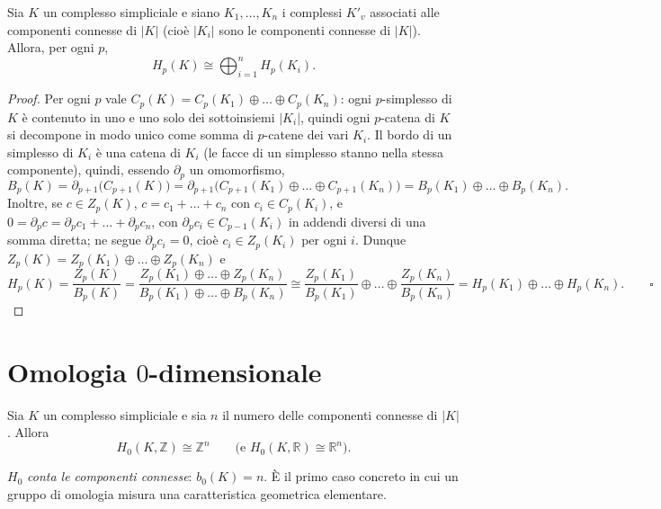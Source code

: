 \begin{teo}
Sia $K$ un complesso simpliciale e siano $K_1, \dots, K_n$ i complessi $K'_{v}$ associati alle componenti connesse di $|K|$ (cio\`e $|K_i|$ sono le componenti connesse di $|K|$). Allora, per ogni $p$,
\[
H_p(K) \cong \bigoplus_{i=1}^n H_p(K_i) .
\]
\end{teo}
\begin{proof}
Per ogni $p$ vale $C_p(K) = C_p(K_1) \oplus \dots \oplus C_p(K_n)$: ogni $p$-simplesso di $K$ \`e contenuto in uno e uno solo dei sottoinsiemi $|K_i|$, quindi ogni $p$-catena di $K$ si decompone in modo unico come somma di $p$-catene dei vari $K_i$. Il bordo di un simplesso di $K_i$ \`e una catena di $K_i$ (le facce di un simplesso stanno nella stessa componente), quindi, essendo $\partial_p$ un omomorfismo,
\[
B_p(K) = \partial_{p+1}\big(C_{p+1}(K)\big) = \partial_{p+1}\big(C_{p+1}(K_1) \oplus \dots \oplus C_{p+1}(K_n)\big) = B_p(K_1) \oplus \dots \oplus B_p(K_n) .
\]
Inoltre, se $c \in Z_p(K)$, $c = c_1 + \dots + c_n$ con $c_i \in C_p(K_i)$, e $0 = \partial_p c = \partial_p c_1 + \dots + \partial_p c_n$, con $\partial_p c_i \in C_{p-1}(K_i)$ in addendi diversi di una somma diretta; ne segue $\partial_p c_i = 0$, cio\`e $c_i \in Z_p(K_i)$ per ogni $i$. Dunque $Z_p(K) = Z_p(K_1) \oplus \dots \oplus Z_p(K_n)$ e
\[
H_p(K) = \frac{Z_p(K)}{B_p(K)} = \frac{Z_p(K_1) \oplus \dots \oplus Z_p(K_n)}{B_p(K_1) \oplus \dots \oplus B_p(K_n)} \cong \frac{Z_p(K_1)}{B_p(K_1)} \oplus \dots \oplus \frac{Z_p(K_n)}{B_p(K_n)} = H_p(K_1) \oplus \dots \oplus H_p(K_n). \qquad \square
\]
\end{proof}

\section{Omologia $0$-dimensionale}

\begin{teo}
Sia $K$ un complesso simpliciale e sia $n$ il numero delle componenti connesse di $|K|$. Allora
\[
H_0(K, \mathbb{Z}) \cong \mathbb{Z}^n \qquad \big( \text{e } H_0(K, \mathbb{R}) \cong \mathbb{R}^n \big).
\]
\end{teo}

\begin{intuizione}
$H_0$ \emph{conta le componenti connesse}: $b_0(K) = n$. \`E il primo caso concreto in cui un gruppo di omologia misura una caratteristica geometrica elementare.
\end{intuizione}

